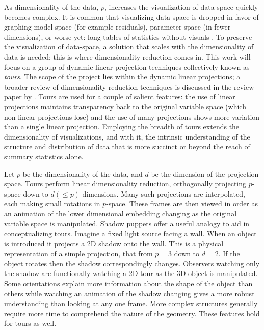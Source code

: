 \documentclass{monashthesis}
\begin{document}
As dimensionality of the data, \(p\), increases the visualization of
data-space quickly becomes complex. It is common that visualizing
data-space is dropped in favor of graphing model-space (for example
residuals), parameter-space (in fewer dimensions), or worse yet: long
tables of statistics without visuals
\autocite{wickham_visualizing_2015}. To preserve the visualization of
data-space, a solution that scales with the dimensionality of data is
needed; this is where dimensionality reduction comes in. This work will
focus on a group of dynamic linear projection techniques collectively
known as \emph{tours}. The scope of the project lies within the dynamic
linear projections; a broader review of dimensionality reduction
techniques is discussed in the review paper by
\textcite{grinstein_high-dimensional_2002}. Tours are used for a couple
of salient features: the use of linear projections maintains
transparency back to the original variable space (which non-linear
projections lose) and the use of many projections shows more variation
than a single linear projection. Employing the breadth of tours extends
the dimensionality of visualizations, and with it, the intrinsic
understanding of the structure and distribution of data that is more
succinct or beyond the reach of summary statistics alone.

Let \(p\) be the dimensionality of the data, and \(d\) be the dimension
of the projection space. Tours perform linear dimensionality reduction,
orthogonally projecting \(p\)-space down to \(d(\leq p)\) dimensions.
Many such projections are interpolated, each making small rotations in
\(p\)-space. These frames are then viewed in order as an animation of
the lower dimensional embedding changing as the original variable space
is manipulated. Shadow puppets offer a useful analogy to aid in
conceptualizing tours. Imagine a fixed light source facing a wall. When
an object is introduced it projects a 2D shadow onto the wall. This is a
physical representation of a simple projection, that from \(p=3\) down
to \(d=2\). If the object rotates then the shadow correspondingly
changes. Observers watching only the shadow are functionally watching a
2D tour as the 3D object is manipulated. Some orientations explain more
information about the shape of the object than others while watching an
animation of the shadow changing gives a more robust understanding than
looking at any one frame. More complex structures generally require more
time to comprehend the nature of the geometry. These features hold for
tours as well.
\end{document}
